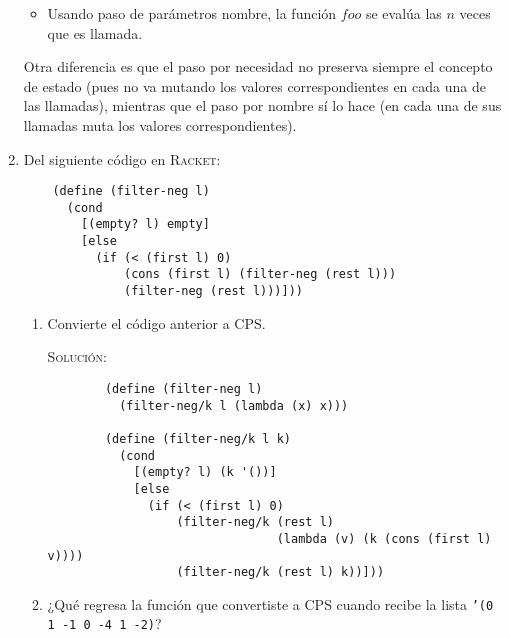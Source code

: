\documentclass[letterpaper,11pt]{article}
\begin{document}
\begin{enumerate}
\begin{itemize}
        \item Usando paso de parámetros nombre, la función $foo$ se evalúa 
        las $n$ veces que es llamada.
    \end{itemize}

    Otra diferencia es que el paso por necesidad no preserva siempre el 
    concepto de estado (pues no va mutando los valores correspondientes en 
    cada una de las llamadas), mientras que el paso por nombre sí lo hace 
    (en cada una de sus llamadas muta los valores correspondientes).

    \item Del siguiente código en \textsc{Racket}:
    \begin{verbatim}
    (define (filter-neg l)
      (cond
        [(empty? l) empty]
        [else 
          (if (< (first l) 0)
              (cons (first l) (filter-neg (rest l)))
              (filter-neg (rest l)))]))
    \end{verbatim}

    \begin{enumerate}
        \item Convierte el código anterior a CPS.

        \textsc{Solución:}
        \begin{verbatim}
        (define (filter-neg l)
          (filter-neg/k l (lambda (x) x)))
          
        (define (filter-neg/k l k)
          (cond
            [(empty? l) (k '())]
            [else
              (if (< (first l) 0)
                  (filter-neg/k (rest l)
                                (lambda (v) (k (cons (first l) v))))
                  (filter-neg/k (rest l) k))]))
        \end{verbatim}

        \newpage
        \item ¿Qué regresa la función que convertiste a CPS cuando recibe la 
        lista \texttt{'(0 1 -1 0 -4 1 -2)}?


\end{enumerate}
\end{enumerate}
\end{document}

